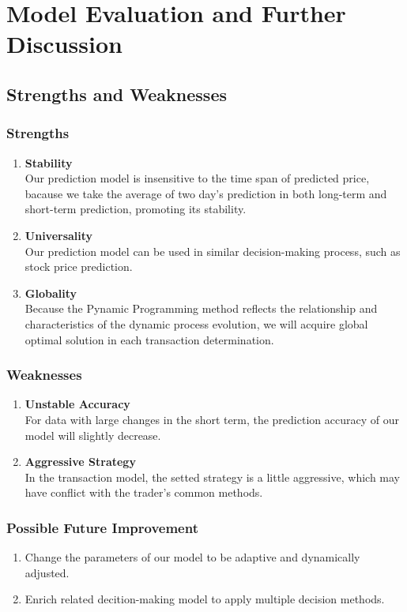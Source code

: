 \documentclass{mcmthesis}
\begin{document}
\section{Model Evaluation and Further Discussion}

\subsection{Strengths and Weaknesses}

\subsubsection{Strengths}
\begin{enumerate}
\item  \textbf{Stability}\\
Our prediction model is insensitive to the time span of predicted price, bacause we take the average of two day's prediction in both long-term and short-term prediction, promoting its stability.
\item  \textbf{Universality}\\
Our prediction model can be used in similar decision-making process, such as stock price prediction.
\item  \textbf{Globality}\\
Because the Pynamic Programming method reflects the relationship and characteristics of the dynamic process evolution, we will acquire global optimal solution in each transaction determination.
\end{enumerate}

\subsubsection{Weaknesses}
\begin{enumerate}
\item  \textbf{Unstable Accuracy}\\
For data with large changes in the short term, the prediction accuracy of our model will slightly decrease.
\item  \textbf{Aggressive Strategy}\\
In the transaction model, the setted strategy is a little aggressive, which may have conflict with the trader's common methods.
\end{enumerate}

\subsubsection{Possible Future Improvement}
\begin{enumerate}
\item  
Change the parameters of our model to be adaptive and dynamically adjusted.
\item  
Enrich related decition-making model to apply multiple decision methods.
\end{enumerate}
\end{document}

